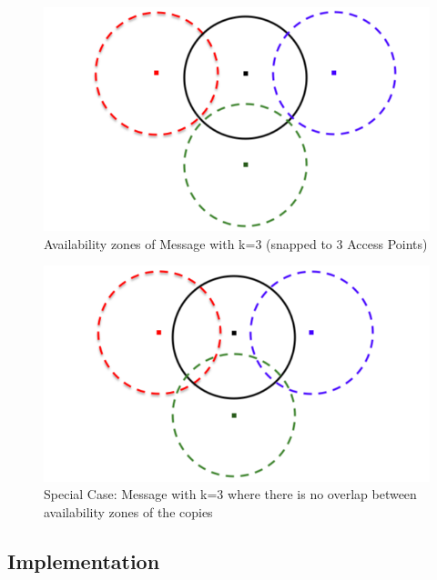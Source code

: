 	\vspace{5mm}
	\begin{figure}[h!]
		\centering 
		\includegraphics[scale=0.45]{./figures/snapped-to-ap-3}
		\caption{Availability zones of Message with k=3 (snapped to 3 Access Points)}
	\end{figure}
	\begin{figure}[h!]
		\centering 
		\includegraphics[scale=0.45]{./figures/snapped-to-ap-4}
		\caption{Special Case: Message with k=3 where there is no overlap between availability zones of the copies}
	\end{figure}

\newpage
\subsection{Implementation}
